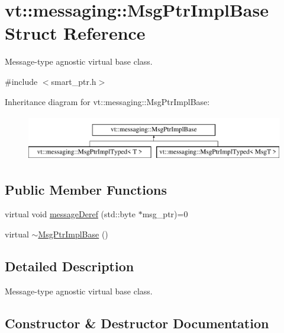\hypertarget{structvt_1_1messaging_1_1_msg_ptr_impl_base}{}\section{vt\+:\+:messaging\+:\+:Msg\+Ptr\+Impl\+Base Struct Reference}
\label{structvt_1_1messaging_1_1_msg_ptr_impl_base}


Message-\/type agnostic virtual base class.  




{\ttfamily \#include $<$smart\+\_\+ptr.\+h$>$}

Inheritance diagram for vt\+:\+:messaging\+:\+:Msg\+Ptr\+Impl\+Base\+:\begin{figure}[H]
\begin{center}
\leavevmode
\includegraphics[height=2.000000cm]{structvt_1_1messaging_1_1_msg_ptr_impl_base}
\end{center}
\end{figure}
\subsection*{Public Member Functions}
\begin{DoxyCompactItemize}
\item 
virtual void \hyperlink{structvt_1_1messaging_1_1_msg_ptr_impl_base_a1fcd13da7faa98a9d4681e572d4b494b}{message\+Deref} (std\+::byte $\ast$msg\+\_\+ptr)=0
\item 
virtual \hyperlink{structvt_1_1messaging_1_1_msg_ptr_impl_base_afcf8208d8636a3793ccdf4bc7d4ee12a}{$\sim$\+Msg\+Ptr\+Impl\+Base} ()
\end{DoxyCompactItemize}


\subsection{Detailed Description}
Message-\/type agnostic virtual base class. 

\subsection{Constructor \& Destructor Documentation}
\mbox{\label{structvt_1_1messaging_1_1_msg_ptr_impl_base_afcf8208d8636a3793ccdf4bc7d4ee12a}} 
